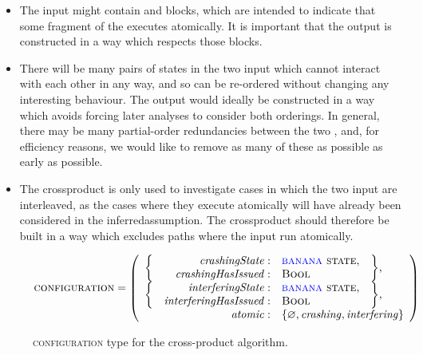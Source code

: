 \begin{itemize}
\item The input {\StateMachines} might contain {\stStartAtomic} and
  {\stEndAtomic} blocks, which are intended to indicate that some
  fragment of the {\StateMachine} executes atomically.  It is
  important that the output {\StateMachine} is constructed in a way
  which respects those blocks.
\item There will be many pairs of states in the two input
  {\StateMachines} which cannot interact with each other in any way,
  and so can be re-ordered without changing any interesting behaviour.
  The output {\StateMachine} would ideally be constructed in a way
  which avoids forcing later analyses to consider both orderings.  In
  general, there may be many partial-order redundancies\cite{Alur1997}
  between the two {\StateMachines}, and, for efficiency reasons, we
  would like to remove as many of these as possible as early as
  possible.
\item The \gls{crossproduct} {\StateMachine} is only used to
  investigate cases in which the two input {\StateMachines} are
  interleaved, as the cases where they execute atomically will have
  already been considered in the \gls{inferredassumption}.  The
  \gls{crossproduct} {\StateMachine} should therefore be built in a
  way which excludes paths where the input {\StateMachines} run
  atomically.
\end{itemize}

\begin{figure}
  \begin{displaymath}
    \textsc{configuration} = \left(\begin{array}{rrll}
      \multirow{2}{*}{\bigg\{} & \mathit{crashingState}: & \textsc{{\StateMachine} state}, & \multirow{2}{*}{\bigg\},}\\
                               & \mathit{crashingHasIssued}: & \textsc{Bool}\\
      \multirow{2}{*}{\bigg\{} & \mathit{interferingState}: & \textsc{{\StateMachine} state}, & \multirow{2}{*}{\bigg\},} \\
                               & \mathit{interferingHasIssued}: & \textsc{Bool}\\
      \multicolumn{2}{r}{\mathit{atomic}:} & \multicolumn{2}{l}{\{ \varnothing, \mathit{crashing}, \mathit{interfering} \}}
    \end{array}\right)
  \end{displaymath}
  \caption{\textsc{configuration} type for the cross-product algorithm.}
  \label{fig:cross_product:configuration}
\end{figure}

